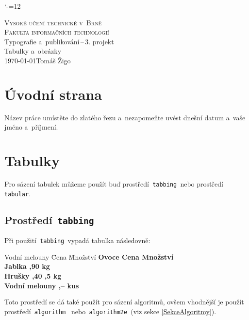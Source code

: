 \documentclass[a4paper,11pt]{article}
\begin{document}
\catcode`-=12
\begin{titlepage}
\begin{center}
\textsc{\Huge Vysoké učení technické v~Brně}\\[0.8em]
\textsc{\huge Fakulta informačních technologií}\\
\LARGE Typografie a~publikování\,--\,3. projekt\\
\Huge Tabulky a~obrázky\\
\Large \today \hfill Tomáš Žigo  \newpage
\end{center}
\end{titlepage}

\section{Úvodní strana}
Název práce umístěte do zlatého řezu a~nezapomeňte uvést dnešní datum a~vaše jméno a~příjmení.

\section{Tabulky}
Pro sázení tabulek můžeme použít buď prostředí\texttt{ tabbing }nebo prostředí\texttt{ tabular}.

\subsection{Prostředí\texttt{ tabbing}}
Při použití\texttt{ tabbing }vypadá tabulka následovně:
\begin{tabbing}
Vodní melouny \quad \= Cena \quad \= Množství \kill
\bfseries Ovoce \>
\bfseries Cena \>
\bfseries Množství \\
Jablka ,90  kg \\
Hrušky ,40 ,5 kg \\
Vodní melouny ,--  kus \\
\end{tabbing}
Toto prostředí se dá také použít pro sázení algoritmů, ovšem vhodnější je použít prostředí\texttt{ algorithm }
nebo\texttt{ algorithm2e }(viz sekce \ref{SekceAlgoritmy}).
\end{document}
